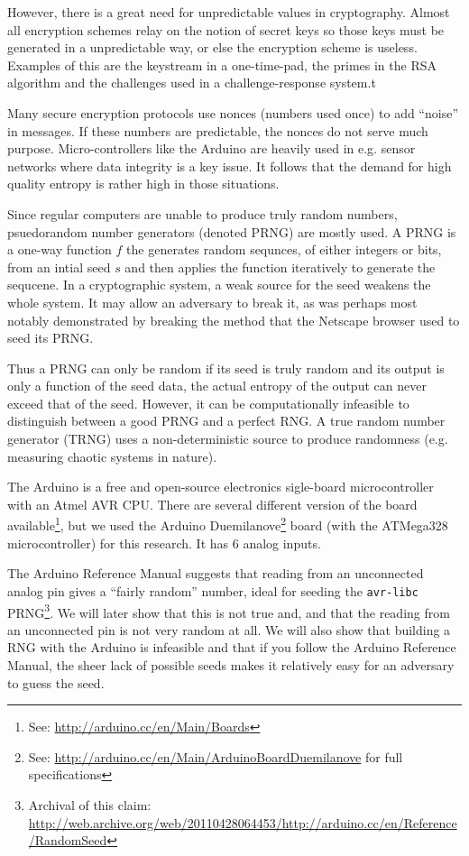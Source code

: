 \documentclass[a4paper]{article}           %
\begin{document}
However, there is a great need for unpredictable values in cryptography. Almost all encryption schemes relay on the notion of secret keys so those keys must be generated in a unpredictable way, or else the encryption scheme is useless. Examples of this are the keystream in a one-time-pad, the primes in the RSA algorithm and the challenges used in a challenge-response system\cite{menezes1996,anthes2011}.t

Many secure encryption protocols use nonces (numbers used once) to add ``noise'' in messages\cite{anthes2011}. If these numbers are predictable, the nonces do not serve much purpose. Micro-controllers like the Arduino are heavily used in e.g. sensor networks\cite{tsense} where data integrity is a key issue. It follows that the demand for high quality entropy is rather high in those situations. 

Since regular computers are unable to produce truly random numbers, psuedorandom number generators (denoted PRNG) are mostly used. A PRNG is a one-way function $f$ the generates random sequnces, of either integers or bits, from an intial seed $s$ and then applies the function iteratively to generate the sequcene\cite{menezes1996}. In a cryptographic system, a weak source for the seed weakens the whole system. It may allow an adversary to break it, as was perhaps most notably demonstrated by breaking the method that the Netscape browser used to seed its PRNG\cite{netscape}. 

Thus a PRNG can only be random if its seed is truly random and its output is only a function of the seed data, the actual entropy of the output can never exceed that of the seed. However, it can be computationally infeasible to distinguish between a good PRNG and a perfect RNG. A true random number generator (TRNG) uses a non-deterministic source to produce randomness (e.g. measuring chaotic systems in nature). 

The Arduino is a free and open-source electronics sigle-board microcontroller with an Atmel AVR CPU. There are several different version of the board available\footnote{See: \url{http://arduino.cc/en/Main/Boards}}, but we used the Arduino Duemilanove\footnote{See: \url{http://arduino.cc/en/Main/ArduinoBoardDuemilanove} for full specifications} board (with the ATMega328\cite{atmegads} microcontroller) for this research. It has 6 analog inputs. 

The Arduino Reference Manual suggests that reading from an unconnected analog pin gives a ``fairly random'' number\cite{ardref}, ideal for seeding the \texttt{avr-libc} PRNG\footnote{Archival of this claim: \url{http://web.archive.org/web/20110428064453/http://arduino.cc/en/Reference/RandomSeed}}. We will later show that this is not true and, and that the reading from an unconnected pin is not very random at all. We will also show that building a RNG with the Arduino is infeasible and that if you follow the Arduino Reference Manual, the sheer lack of possible seeds makes it relatively easy for an adversary to guess the seed.
\end{document}
